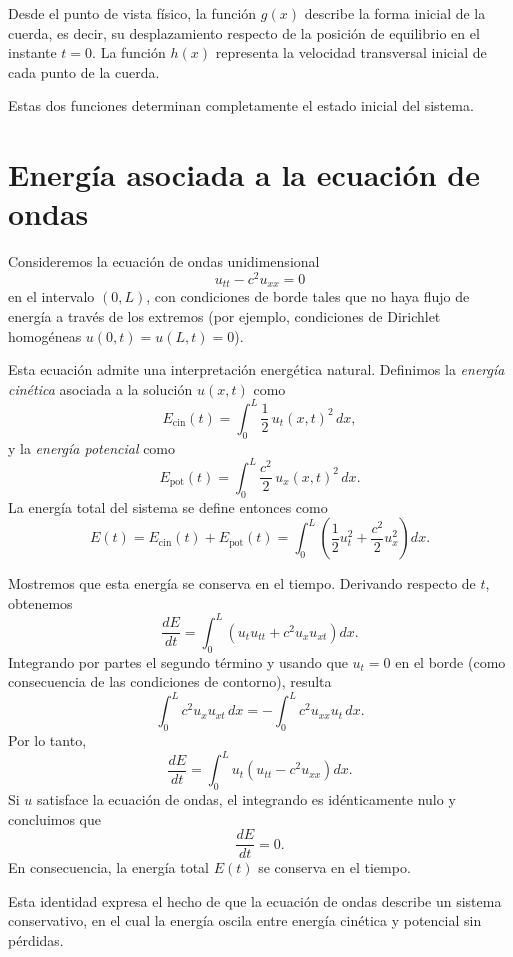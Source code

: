 \documentclass[12pt, a4paper]{amsbook}
\theoremstyle{remark}
\theoremstyle{definition}
\numberwithin{section}{chapter}
\numberwithin{subsection}{section}
\numberwithin{equation}{section}
\numberwithin{figure}{chapter}
\begin{document}
Desde el punto de vista físico, la función $g(x)$ describe la forma inicial de la cuerda, es decir, su desplazamiento respecto de la posición de equilibrio en el instante $t=0$. La función $h(x)$ representa la velocidad transversal inicial de cada punto de la cuerda.

Estas dos funciones determinan completamente el estado inicial del sistema.


\section{Energía asociada a la ecuación de ondas}\label{sec:energia-ondas}

Consideremos la ecuación de ondas unidimensional
\[
u_{tt} - c^2 u_{xx} = 0
\]
en el intervalo $(0,L)$, con condiciones de borde tales que no haya flujo de energía a través de los extremos (por ejemplo, condiciones de Dirichlet homogéneas $u(0,t)=u(L,t)=0$).

Esta ecuación admite una interpretación energética natural. Definimos la \emph{energía cinética} asociada a la solución $u(x,t)$ como
\[
E_{\mathrm{cin}}(t) = \int_0^L \frac12 \, u_t(x,t)^2 \, dx,
\]
y la \emph{energía potencial} como
\[
E_{\mathrm{pot}}(t) = \int_0^L \frac{c^2}{2} \, u_x(x,t)^2 \, dx.
\]
La energía total del sistema se define entonces como
\[
E(t) = E_{\mathrm{cin}}(t) + E_{\mathrm{pot}}(t)
= \int_0^L \left( \frac12 u_t^2 + \frac{c^2}{2} u_x^2 \right) dx.
\]

Mostremos que esta energía se conserva en el tiempo. Derivando respecto de $t$, obtenemos
\[
\frac{dE}{dt}
= \int_0^L \left( u_t u_{tt} + c^2 u_x u_{xt} \right) dx.
\]
Integrando por partes el segundo término y usando que $u_t=0$ en el borde (como consecuencia de las condiciones de contorno), resulta
\[
\int_0^L c^2 u_x u_{xt} \, dx
= - \int_0^L c^2 u_{xx} u_t \, dx.
\]
Por lo tanto,
\[
\frac{dE}{dt}
= \int_0^L u_t \left( u_{tt} - c^2 u_{xx} \right) dx.
\]
Si $u$ satisface la ecuación de ondas, el integrando es idénticamente nulo y concluimos que
\[
\frac{dE}{dt} = 0.
\]
En consecuencia, la energía total $E(t)$ se conserva en el tiempo.

Esta identidad expresa el hecho de que la ecuación de ondas describe un sistema conservativo, en el cual la energía oscila entre energía cinética y potencial sin pérdidas.
\end{document}
